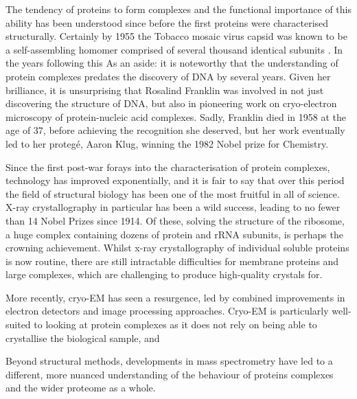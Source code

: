 \documentclass[a4paper,11pt,twoside,openright]{book}
\let\cite\supercite
\begin{document}
The tendency of proteins to form complexes and the functional importance of this ability has been understood since before the first proteins were characterised structurally. Certainly by 1955 the Tobacco mosaic virus capsid was known to be a self-assembling homomer comprised of several thousand identical subunits \cite{Fraenkel-Conrat1955}. In the years following this %
As an aside: it is noteworthy that the understanding of protein complexes predates the discovery of DNA by several years. Given her brilliance, it is unsurprising that Rosalind Franklin was involved in not just discovering the structure of DNA, but also in pioneering work on cryo-electron microscopy of protein-nucleic acid complexes. Sadly, Franklin died in 1958 at the age of 37, before achieving the recognition she deserved, but her work eventually led to her proteg\'{e},  Aaron Klug, winning the 1982 Nobel prize for Chemistry. %

Since the first post-war forays into the characterisation of protein complexes, technology has improved exponentially, and it is fair to say that over this period the field of structural biology has been one of the most fruitful in all of science. X-ray crystallography in particular has been a wild success, leading to no fewer than 14 Nobel Prizes since 1914. Of these, solving the structure of the ribosome, a huge complex containing dozens of protein and rRNA subunits, is perhaps the crowning achievement. Whilst x-ray crystallography of individual soluble proteins is now routine, there are still intractable difficulties for membrane proteins and large complexes, which are challenging to produce high-quality crystals for.

More recently, cryo-EM has seen a resurgence, led by combined improvements in electron detectors and image processing approaches. Cryo-EM is particularly well-suited to looking at protein complexes as it does not rely on being able to crystallise the biological sample, and

Beyond structural methods, developments in mass spectrometry have led to a different, more nuanced understanding of the behaviour of proteins complexes and the wider proteome as a whole.

%
\end{document}
